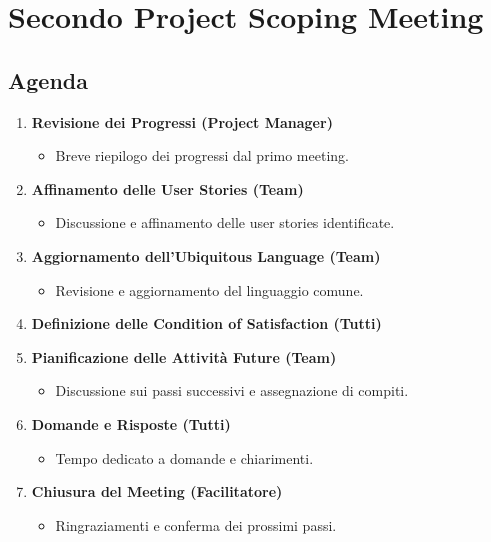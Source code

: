 \section{Secondo Project Scoping Meeting}

\subsection{Agenda}

\begin{enumerate}
    \item \textbf{Revisione dei Progressi (Project Manager)}
          \begin{itemize}
              \item Breve riepilogo dei progressi dal primo meeting.
          \end{itemize}

    \item \textbf{Affinamento delle User Stories (Team)}
          \begin{itemize}
              \item Discussione e affinamento delle user stories identificate.
          \end{itemize}

    \item \textbf{Aggiornamento dell'Ubiquitous Language (Team)}
          \begin{itemize}
              \item Revisione e aggiornamento del linguaggio comune.
          \end{itemize}

    \item \textbf{Definizione delle Condition of Satisfaction (Tutti)}

    \item \textbf{Pianificazione delle Attività Future (Team)}
          \begin{itemize}
              \item Discussione sui passi successivi e assegnazione di compiti.
          \end{itemize}

    \item \textbf{Domande e Risposte (Tutti)}
          \begin{itemize}
              \item Tempo dedicato a domande e chiarimenti.
          \end{itemize}

    \item \textbf{Chiusura del Meeting (Facilitatore)}
          \begin{itemize}
              \item Ringraziamenti e conferma dei prossimi passi.
          \end{itemize}
\end{enumerate}

